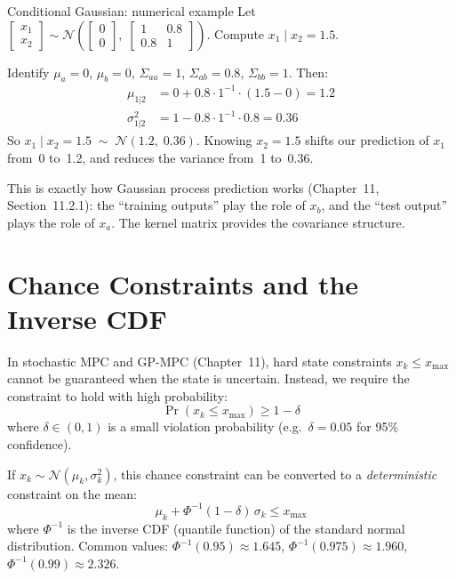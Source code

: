 \begin{examplebox}{Conditional Gaussian: numerical example}
Let $\begin{bmatrix} x_1 \\ x_2 \end{bmatrix} \sim \mathcal{N}\!\left(\begin{bmatrix} 0 \\ 0 \end{bmatrix},\; \begin{bmatrix} 1 & 0.8 \\ 0.8 & 1 \end{bmatrix}\right)$. Compute $x_1 \mid x_2 = 1.5$.

\solution
Identify $\mu_a = 0$, $\mu_b = 0$, $\Sigma_{aa} = 1$, $\Sigma_{ab} = 0.8$, $\Sigma_{bb} = 1$. Then:
\begin{align*}
	\mu_{1|2} &= 0 + 0.8 \cdot 1^{-1} \cdot (1.5 - 0) = 1.2 \\
	\sigma^2_{1|2} &= 1 - 0.8 \cdot 1^{-1} \cdot 0.8 = 0.36
\end{align*}
So $x_1 \mid x_2 = 1.5 \;\sim\; \mathcal{N}(1.2,\; 0.36)$. Knowing $x_2 = 1.5$ shifts our prediction of $x_1$ from~0 to~1.2, and reduces the variance from~1 to~0.36.

This is exactly how Gaussian process prediction works (Chapter~11, Section~11.2.1): the ``training outputs'' play the role of $x_b$, and the ``test output'' plays the role of $x_a$. The kernel matrix provides the covariance structure.
\end{examplebox}

\section{Chance Constraints and the Inverse CDF}
\label{sec:app_chance_constraints}

In stochastic MPC and GP-MPC (Chapter~11), hard state constraints $x_k \le x_{\max}$ cannot be guaranteed when the state is uncertain. Instead, we require the constraint to hold with high probability:
\[
	\Pr(x_k \le x_{\max}) \ge 1 - \delta
\]
where $\delta \in (0, 1)$ is a small violation probability (e.g.\ $\delta = 0.05$ for 95\% confidence).

If $x_k \sim \mathcal{N}(\mu_k, \sigma_k^2)$, this chance constraint can be converted to a \emph{deterministic} constraint on the mean:
\[
	\mu_k + \Phi^{-1}(1-\delta)\,\sigma_k \le x_{\max}
\]
where $\Phi^{-1}$ is the inverse CDF (quantile function) of the standard normal distribution. Common values: $\Phi^{-1}(0.95) \approx 1.645$, $\Phi^{-1}(0.975) \approx 1.960$, $\Phi^{-1}(0.99) \approx 2.326$.

